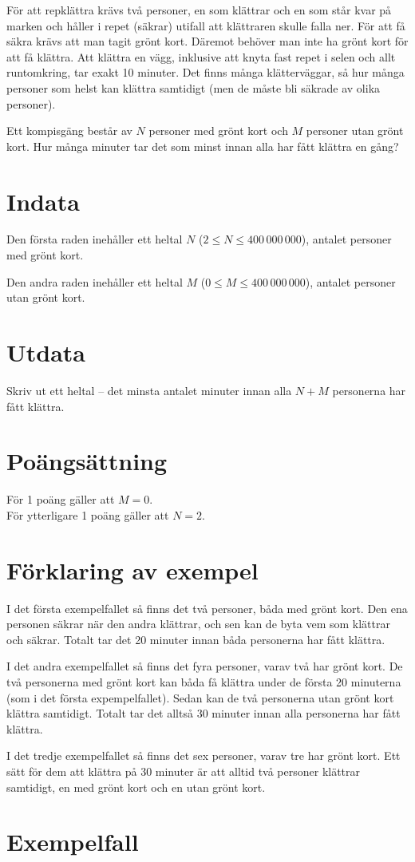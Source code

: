 

För att repklättra krävs två personer, en som klättrar och en som står kvar på marken och håller i repet (säkrar) utifall att klättraren skulle falla ner. För att få säkra krävs att man tagit grönt kort. Däremot behöver man inte ha grönt kort för att få klättra. Att klättra en vägg, inklusive att knyta fast repet i selen och allt runtomkring, tar exakt 10 minuter. Det finns många klätterväggar, så hur många personer som helst kan klättra samtidigt (men de måste bli säkrade av olika personer).

Ett kompisgäng består av $N$ personer med grönt kort och $M$ personer utan grönt kort. Hur många minuter tar det som minst innan alla har fått klättra en gång?

\section*{Indata}
Den första raden inehåller ett heltal $N$ ($2 \le N \le 400\,000\,000$), antalet personer med grönt kort.

Den andra raden inehåller ett heltal $M$ ($0 \le M \le 400\,000\,000$), antalet personer utan grönt kort.


\section*{Utdata}
Skriv ut ett heltal -- det minsta antalet minuter innan alla $N+M$ personerna har fått klättra.

\section*{Poängsättning}
För 1 poäng gäller att $M = 0$. \\
För ytterligare 1 poäng gäller att $N = 2$.

\section*{Förklaring av exempel}
I det första exempelfallet så finns det två personer, båda med grönt kort.
Den ena personen säkrar när den andra klättrar, och sen kan de byta vem som klättrar och säkrar. Totalt tar det 20 minuter innan båda personerna har fått klättra.

I det andra exempelfallet så finns det fyra personer, varav två har grönt kort.
De två personerna med grönt kort kan båda få klättra under de första 20 minuterna (som i
det första expempelfallet). Sedan kan de två personerna utan grönt kort klättra samtidigt.
Totalt tar det alltså 30 minuter innan alla personerna har fått klättra.

I det tredje exempelfallet så finns det sex personer, varav tre har grönt kort.
Ett sätt för dem att klättra på 30 minuter är att alltid två personer klättrar samtidigt, en med grönt kort och en utan grönt kort.

\section*{Exempelfall}

